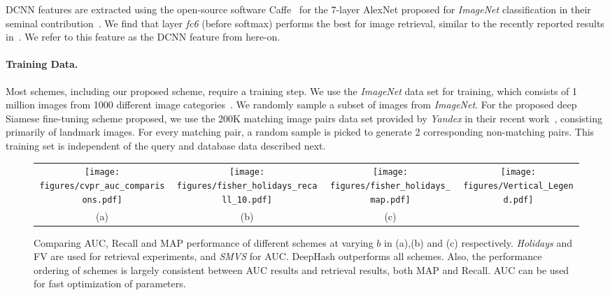 \documentclass[10pt,twocolumn,letterpaper]{article}
\begin{document}
DCNN features are extracted using the open-source software Caffe~\cite{Caffe} for the 7-layer AlexNet proposed for {\it ImageNet} classification in their seminal contribution~\cite{AlexNet}.
We find that layer {\it fc6} (before softmax) performs the best for image retrieval, similar to the recently reported results in~\cite{Yandex}.
We refer to this feature as the DCNN feature from here-on.

\vspace{-0.1em}
\paragraph{Training Data.}
Most schemes, including our proposed scheme, require a training step.
We use the {\it ImageNet} data set for training, which consists of 1 million images from 1000 different image categories~\cite{DengImagenet}.
We randomly sample a subset of images from {\it ImageNet}.
For the proposed deep Siamese fine-tuning scheme proposed, we use the 200K matching image pairs data set provided by {\it Yandex} in their recent work~\cite{Yandex}, consisting primarily of landmark images. 
For every matching pair, a random sample is picked to generate 2 corresponding non-matching pairs.
This training set is independent of the query and database data described next.

\begin{figure*}
	\centering
		\begin{tabular}{ @{}c@{} @{}c@{} @{}c@{} @{}c@{}}
			\texttt{[image: figures/cvpr\_auc\_comparisons.pdf]} &
			\texttt{[image: figures/fisher\_holidays\_recall\_10.pdf]} & 
			\texttt{[image: figures/fisher\_holidays\_map.pdf]} & 
			\texttt{[image: figures/Vertical\_Legend.pdf]}  \\ 			
			(a) & (b) & (c) &  \\
		\end{tabular}
		\caption{\footnotesize 
		Comparing AUC, Recall and MAP performance of different schemes at varying $b$ in (a),(b) and (c) respectively. {\it Holidays} and FV are used for retrieval experiments, and {\it SMVS} for AUC. DeepHash outperforms all schemes.  Also, the performance ordering of schemes is largely consistent between AUC results and retrieval results, both MAP and Recall. AUC can be used for fast optimization of parameters.
		}	
		\label{fig:auc_all}
		
\end{figure*}
\end{document}
